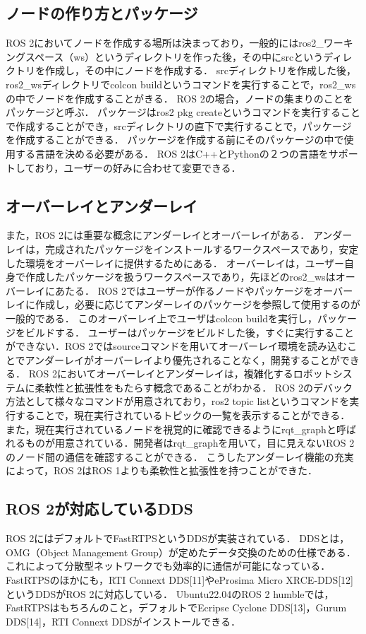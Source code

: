 \subsection{ノードの作り方とパッケージ}
ROS 2においてノードを作成する場所は決まっており，一般的にはros2\_ワーキングスペース（ws）というディレクトリを作った後，その中にsrcというディレクトリを作成し，その中にノードを作成する．
srcディレクトリを作成した後，ros2\_wsディレクトリでcolcon buildというコマンドを実行することで，ros2\_wsの中でノードを作成することがきる．
ROS 2の場合，ノードの集まりのことをパッケージと呼ぶ．
パッケージはros2 pkg createというコマンドを実行することで作成することができ，srcディレクトリの直下で実行することで，パッケージを作成することができる．
パッケージを作成する前にそのパッケージの中で使用する言語を決める必要がある．
ROS 2はC++とPythonの２つの言語をサポートしており，ユーザーの好みに合わせて変更できる．
\subsection{オーバーレイとアンダーレイ}
また，ROS 2には重要な概念にアンダーレイとオーバーレイがある．
アンダーレイは，完成されたパッケージをインストールするワークスペースであり，安定した環境をオーバーレイに提供するためにある．
オーバーレイは，ユーザー自身で作成したパッケージを扱うワークスペースであり，先ほどのros2\_wsはオーバーレイにあたる．
ROS 2ではユーザーが作るノードやパッケージをオーバーレイに作成し，必要に応じてアンダーレイのパッケージを参照して使用するのが一般的である．
このオーバーレイ上でユーザはcolcon buildを実行し，パッケージをビルドする．
ユーザーはパッケージをビルドした後，すぐに実行することができない．ROS 2ではsourceコマンドを用いてオーバーレイ環境を読み込むことでアンダーレイがオーバーレイより優先されることなく，開発することができる．
ROS 2においてオーバーレイとアンダーレイは，複雑化するロボットシステムに柔軟性と拡張性をもたらす概念であることがわかる．
ROS 2のデバック方法として様々なコマンドが用意されており，ros2 topic listというコマンドを実行することで，現在実行されているトピックの一覧を表示することができる．
また，現在実行されているノードを視覚的に確認できるようにrqt\_graphと呼ばれるものが用意されている．開発者はrqt\_graphを用いて，目に見えないROS 2のノード間の通信を確認することができる．
こうしたアンダーレイ機能の充実によって，ROS 2はROS 1よりも柔軟性と拡張性を持つことができた．
\subsection{ROS 2が対応しているDDS}
ROS 2にはデフォルトでFastRTPSというDDSが実装されている．
DDSとは，OMG（Object Management Group）が定めたデータ交換のための仕様である．これによって分散型ネットワークでも効率的に通信が可能になっている．
FastRTPSのほかにも，RTI Connext DDS[11]やeProsima Micro XRCE-DDS[12]というDDSがROS 2に対応している．
Ubuntu22.04のROS 2 humbleでは，FastRTPSはもちろんのこと，デフォルトでEcripse Cyclone DDS[13]，Gurum DDS[14]，RTI Connext DDSがインストールできる．%
